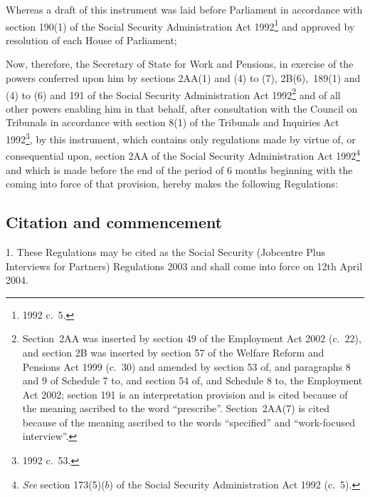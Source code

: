 \documentclass[12pt,a4paper]{article}
\title{\regstitle}
\author{S.I.\ 2003 No.\ 1886}
\date{Made
17th July 2003\\
Coming into~force
12th April 2004
}
\begin{document}
\maketitle

\noindent
Whereas a draft of this instrument was laid before Parliament in accordance with section 190(1) of the Social Security Administration Act 1992\footnote{1992 c.~5.} and approved by resolution of each House of Parliament;

Now, therefore, the Secretary of State for Work and Pensions, in exercise of the powers conferred upon him by sections 2AA(1) and (4) to (7), 2B(6),~189(1) and (4) to (6) and 191 of the Social Security Administration Act 1992\footnote{Section~2AA was inserted by section 49 of the Employment Act 2002 (c.~22), and section 2B was inserted by section 57 of the Welfare Reform and Pensions Act 1999 (c.~30) and amended by section 53 of, and paragraphs 8 and 9 of Schedule 7 to, and section 54 of, and Schedule 8 to, the Employment Act 2002; section 191 is an interpretation provision and is cited because of the meaning ascribed to the word “prescribe”. Section~2AA(7) is cited because of the meaning ascribed to the words “specified” and “work-focused interview”.} and of all other powers enabling him in that behalf, after consultation with the Council on Tribunals in accordance with section 8(1) of the Tribunals and Inquiries Act 1992\footnote{1992 c.~53.}, by this instrument, which contains only regulations made by virtue of, or consequential upon, section 2AA of the Social Security Administration Act 1992\footnote{\emph{See} section 173(5)($b$) of the Social Security Administration Act 1992 (c.~5).} and which is made before the end of the period of 6 months beginning with the coming into force of that provision, hereby makes the following Regulations: 

{\sloppy

\tableofcontents

}

\bigskip

\setcounter{secnumdepth}{-2}

\subsection[1. Citation and commencement]{Citation and commencement}

1.  These Regulations may be cited as the Social Security (Jobcentre Plus Interviews for Partners) Regulations 2003 and shall come into force on 12th April 2004.
\end{document}
